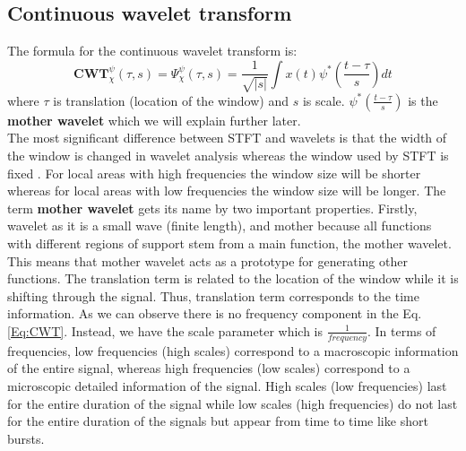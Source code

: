 \subsection{Continuous wavelet transform}
The formula for the continuous wavelet transform is:
\begin{equation}
\textbf{CWT}^\psi_\chi(\tau,s) = \Psi^{\psi}_{\chi}(\tau,s) = \frac{1}{\sqrt{\left|s\right|}}\int x(t) \psi ^{\ast} (\frac{t - \tau}{s})dt
\label{Eq:CWT}
\end{equation}
where $\tau $ is translation (location of the window) and $s$ is scale. $\psi ^{\ast} (\frac{t - \tau}{s})$ is the \textbf{mother wavelet} which we will explain further later. \\
The most significant difference between STFT and wavelets is that the width of the window is changed in wavelet analysis whereas the window used by STFT is fixed \cite{giurgiutiu_comparison_2003}. For local areas with high frequencies the window size will be shorter whereas for local areas with low frequencies the window size will be longer. 
The term \textbf{mother wavelet} gets its name by two important properties. Firstly, wavelet as it is a small wave (finite length), and mother because all functions with different regions of support stem from a main function, the mother wavelet. This means that mother wavelet acts as a prototype for generating other functions. The translation term is related to the location of  the window while it is shifting through the signal. Thus, translation term corresponds to the time information. As we can observe there is no frequency component in the Eq. \ref{Eq:CWT}. Instead, we have the scale parameter which is $\frac{1}{frequency}$. In terms of frequencies, low frequencies (high scales) correspond to a macroscopic information of the entire signal, whereas high frequencies (low scales) correspond to a microscopic detailed information of the signal. High scales (low frequencies) last for the entire duration of the signal while low scales (high frequencies) do not last for the entire duration of the signals but appear from time to time like short bursts.  \\
